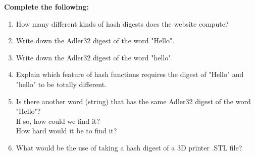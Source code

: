 \documentclass{tufte-handout}
\begin{document}
\textbf{Complete the following:}
\begin{enumerate}
\item{How many different kinds of hash digests does the website compute?}\\  
\item{Write down the Adler32 digest of the word "Hello". }\\
\item{Write down the Adler32 digest of the word "hello". }\\
\item{Explain which feature of hash functions requires the digest of "Hello" and "hello" to be totally different.}\\ \vspace{1cm}
\item{Is there another word (string) that has the same Adler32 digest of the word "Hello"?\\ \vspace{2cm}  If so, how could we find it?\\ \vspace{2cm}  How hard would it be to find it?} \\ \vspace{2cm}
\item{What would be the use of taking a hash digest of a 3D printer .STL file?}
\end{enumerate}



%
%
\end{document}
